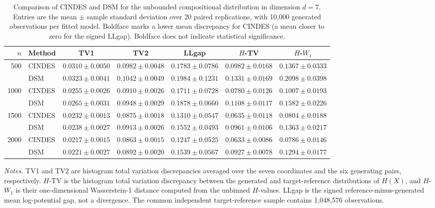\begin{table}[htbp]
\centering
\caption{Comparison of CINDES and DSM for the unbounded compositional distribution in dimension $d=7$. Entries are the mean $\pm$ sample standard deviation over 20 paired replications, with 10,000 generated observations per fitted model. Boldface marks a lower mean discrepancy for CINDES (a mean closer to zero for the signed LLgap). Boldface does not indicate statistical significance.}
\label{tab:cindes_accuracy_full}
\small
\setlength{\tabcolsep}{4pt}
\renewcommand{\arraystretch}{1.15}
\begin{tabular}{rlccccc}
\toprule
$n$ & Method & TV1 & TV2 & LLgap & $H$-TV & $H$-$W_1$ \\
\midrule
500 & CINDES & $\boldsymbol{0.0310 \pm 0.0050}$ & $\boldsymbol{0.0982 \pm 0.0048}$ & $\boldsymbol{0.1783 \pm 0.0786}$ & $\boldsymbol{0.0982 \pm 0.0168}$ & $\boldsymbol{0.1367 \pm 0.0333}$ \\
 & DSM & $0.0323 \pm 0.0041$ & $0.1042 \pm 0.0049$ & $0.1984 \pm 0.1231$ & $0.1331 \pm 0.0169$ & $0.2098 \pm 0.0398$ \\
\midrule
1000 & CINDES & $\boldsymbol{0.0255 \pm 0.0026}$ & $\boldsymbol{0.0910 \pm 0.0026}$ & $\boldsymbol{0.1711 \pm 0.0728}$ & $\boldsymbol{0.0780 \pm 0.0126}$ & $\boldsymbol{0.1007 \pm 0.0193}$ \\
 & DSM & $0.0265 \pm 0.0031$ & $0.0948 \pm 0.0029$ & $0.1878 \pm 0.0660$ & $0.1108 \pm 0.0117$ & $0.1582 \pm 0.0226$ \\
\midrule
1500 & CINDES & $\boldsymbol{0.0232 \pm 0.0013}$ & $\boldsymbol{0.0875 \pm 0.0018}$ & $\boldsymbol{0.1310 \pm 0.0547}$ & $\boldsymbol{0.0635 \pm 0.0118}$ & $\boldsymbol{0.0804 \pm 0.0188}$ \\
 & DSM & $0.0238 \pm 0.0027$ & $0.0913 \pm 0.0026$ & $0.1552 \pm 0.0493$ & $0.0961 \pm 0.0106$ & $0.1363 \pm 0.0217$ \\
\midrule
2000 & CINDES & $\boldsymbol{0.0217 \pm 0.0015}$ & $\boldsymbol{0.0863 \pm 0.0015}$ & $\boldsymbol{0.1247 \pm 0.0525}$ & $\boldsymbol{0.0633 \pm 0.0086}$ & $\boldsymbol{0.0786 \pm 0.0146}$ \\
 & DSM & $0.0221 \pm 0.0027$ & $0.0892 \pm 0.0020$ & $0.1539 \pm 0.0567$ & $0.0927 \pm 0.0078$ & $0.1294 \pm 0.0177$ \\
\bottomrule
\end{tabular}
\par\smallskip
\begin{minipage}{\textwidth}
\footnotesize
\textit{Notes.} TV1 and TV2 are histogram total variation discrepancies averaged over the seven coordinates and the six generating pairs, respectively. $H$-TV is the histogram total variation discrepancy between the generated and target-reference distributions of $H(X)$, and $H$-$W_1$ is their one-dimensional Wasserstein-1 distance computed from the unbinned $H$-values. LLgap is the signed reference-minus-generated mean log-potential gap, not a divergence. The common independent target-reference sample contains 1,048,576 observations.
\end{minipage}
\end{table}

